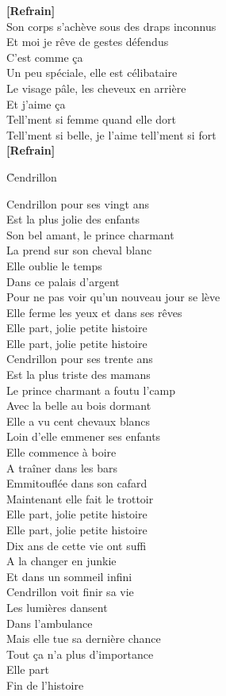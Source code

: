 \documentclass{novel}
\begin{document}
\textbf{[Refrain]}\\

Son corps s'achève sous des draps inconnus \\
Et moi je rêve de gestes défendus \\
C'est comme ça \\
Un peu spéciale, elle est célibataire \\
Le visage pâle, les cheveux en arrière \\
Et j'aime ça \\
Tell'ment si femme quand elle dort \\
Tell'ment si belle, je l'aime tell'ment si fort \\

\textbf{[Refrain]}

\newpage
\small
\h*{Cendrillon}

Cendrillon pour ses vingt ans \\
Est la plus jolie des enfants \\
Son bel amant, le prince charmant \\
La prend sur son cheval blanc \\
Elle oublie le temps \\
Dans ce palais d'argent \\
Pour ne pas voir qu'un nouveau jour se lève \\
Elle ferme les yeux et dans ses rêves \\
Elle part, jolie petite histoire \\
Elle part, jolie petite histoire \\

Cendrillon pour ses trente ans \\
Est la plus triste des mamans \\
Le prince charmant a foutu l'camp \\
Avec la belle au bois dormant \\
Elle a vu cent chevaux blancs \\
Loin d'elle emmener ses enfants \\
Elle commence à boire \\
A traîner dans les bars \\
Emmitouflée dans son cafard \\
Maintenant elle fait le trottoir \\
Elle part, jolie petite histoire \\
Elle part, jolie petite histoire \\

Dix ans de cette vie ont suffi \\
A la changer en junkie \\
Et dans un sommeil infini \\
Cendrillon voit finir sa vie \\
Les lumières dansent \\
Dans l'ambulance \\
Mais elle tue sa dernière chance \\
Tout ça n'a plus d'importance \\
Elle part \\
Fin de l'histoire \\
\end{document}
